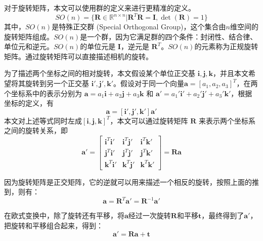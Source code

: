 对于旋转矩阵，本文可以使用群的定义来进行更精准的定义。
\begin{equation}
    SO(n) = \{\boldsymbol{R} \in \mathbb{R}^{n \times n} | \boldsymbol{R}^T\boldsymbol{R} = \boldsymbol{I}, \det (\boldsymbol{R}) = 1\}
\end{equation}
其中，$SO(n)$是特殊正交群 (Special Orthogonal Group)，这个集合由$n$维空间的旋转矩阵组成。$SO(n)$是一个群，因为它满足群的四个条件：封闭性、结合律、单位元和逆元。$SO(n)$的单位元是 $\boldsymbol{I}$，逆元是 $\boldsymbol{R}^T$。$SO(n)$的元素称为正规旋转矩阵。通过旋转矩阵可以直接描述相机的旋转。

为了描述两个坐标之间的相对旋转，本文假设某个单位正交基 $\boldsymbol{i}, \boldsymbol{j}, \boldsymbol{k}$，并且本文希望将其旋转到另一个正交基 $\boldsymbol{i}', \boldsymbol{j}', \boldsymbol{k}'$。假设对于同一个向量$\boldsymbol{a} = [a_1, a_2, a_3]^T$，在两个坐标系中的表示分别为 $\boldsymbol{a} = a_1\boldsymbol{i} + a_2\boldsymbol{j} + a_3\boldsymbol{k}$ 和 $\boldsymbol{a}' = a_1'\boldsymbol{i}' + a_2'\boldsymbol{j}' + a_3'\boldsymbol{k}'$，根据坐标的定义，有
\begin{equation}
    [\boldsymbol{i}, \boldsymbol{j}, \boldsymbol{k}] \boldsymbol{a} = [\boldsymbol{i}', \boldsymbol{j}', \boldsymbol{k}'] \boldsymbol{a}'
\end{equation}
本文对上述等式同时左成$[\boldsymbol{i}, \boldsymbol{j}, \boldsymbol{k}]^T$，本文可以通过旋转矩阵 $\boldsymbol{R}$ 来表示两个坐标系之间的旋转关系，即
\begin{equation}
    \boldsymbol{a}' = 
    \begin{bmatrix}
    \boldsymbol{i}^T \boldsymbol{i}' & \boldsymbol{i}^T \boldsymbol{j}' & \boldsymbol{i}^T \boldsymbol{k}' \\
    \boldsymbol{j}^T \boldsymbol{i}' & \boldsymbol{j}^T \boldsymbol{j}' & \boldsymbol{j}^T \boldsymbol{k}' \\
    \boldsymbol{k}^T \boldsymbol{i}' & \boldsymbol{k}^T \boldsymbol{j}' & \boldsymbol{k}^T \boldsymbol{k}'
    \end{bmatrix}
    =
    \boldsymbol{R} \boldsymbol{a}
\end{equation}

因为旋转矩阵是正交矩阵，它的逆就可以用来描述一个相反的旋转，按照上面的推到，则有：
\begin{equation}
    \boldsymbol{a} = \boldsymbol{R}^T \boldsymbol{a}' = \boldsymbol{R}^{-1} \boldsymbol{a}'
\end{equation}

在欧式变换中，除了旋转还有平移，将$\boldsymbol{a}$经过一次旋转$\boldsymbol{R}$和平移$\boldsymbol{t}$，最终得到了$\boldsymbol{a}'$，把旋转和平移组合起来，得到：
\begin{equation}
    \boldsymbol{a}' = \boldsymbol{R} \boldsymbol{a} + \boldsymbol{t}
    \label{eq:rotation_translation}
\end{equation}


